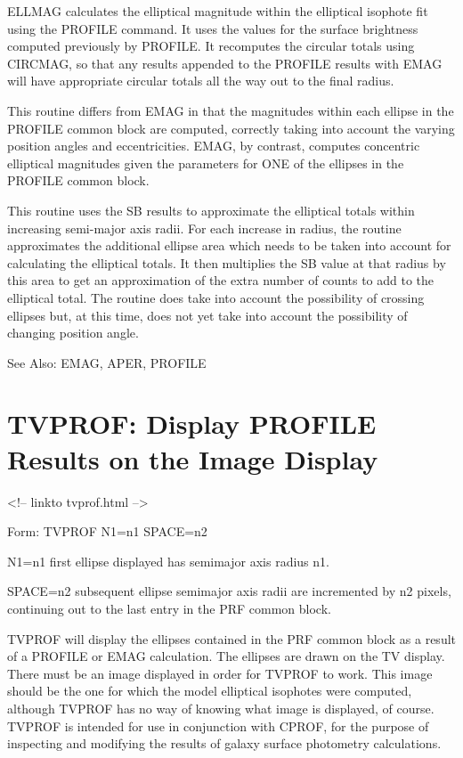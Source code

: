 ELLMAG calculates the elliptical magnitude within the elliptical isophote
fit using the PROFILE command.  It uses the values for the surface
brightness computed previously by PROFILE.  It recomputes the circular
totals using CIRCMAG, so that any results appended to the PROFILE results
with EMAG will have appropriate circular totals all the way out to the
final radius.

This routine differs from EMAG in that the magnitudes within each ellipse
in the PROFILE common block are computed, correctly taking into account the
varying position angles and eccentricities.  EMAG, by contrast, computes
concentric elliptical magnitudes given the parameters for ONE of the
ellipses in the PROFILE common block.

This routine uses the SB results to approximate the elliptical totals
within increasing semi-major axis radii.  For each increase in radius, the
routine approximates the additional ellipse area which needs to be taken
into account for calculating the elliptical totals.  It then multiplies the
SB value at that radius by this area to get an approximation of the extra
number of counts to add to the elliptical total.  The routine does take
into account the possibility of crossing ellipses but, at this time, does
not yet take into account the possibility of changing position angle.

See Also: EMAG, APER, PROFILE


\section{TVPROF: Display PROFILE Results on the Image Display}
\begin{rawhtml}
<!-- linkto tvprof.html -->
\end{rawhtml}
\begin{command}
  \item[Form: TVPROF N1=n1 SPACE=n2\hfill]{}
  \item[N1=n1]{first ellipse displayed has semimajor axis radius n1.}
  \item[SPACE=n2]{subsequent ellipse semimajor axis radii are incremented
       by n2 pixels, continuing out to the last entry in the PRF common
       block.}
\end{command}

TVPROF will display the ellipses contained in the PRF common block as a
result of a PROFILE or EMAG calculation. The ellipses are drawn on the TV
display. There must be an image displayed in order for TVPROF to work. This
image should be the one for which the model elliptical isophotes were
computed, although TVPROF has no way of knowing what image is displayed, of
course. TVPROF is intended for use in conjunction with CPROF, for the
purpose of inspecting and modifying the results of galaxy surface
photometry calculations.

